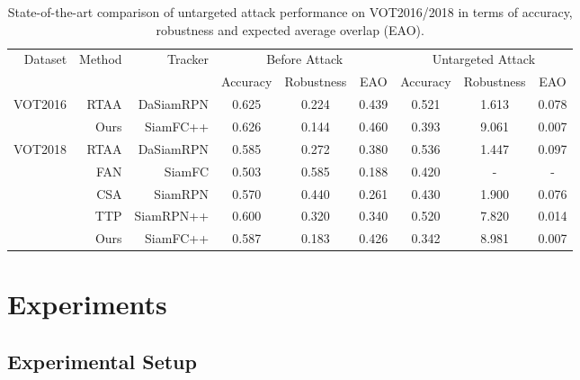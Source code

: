 \documentclass[journal]{IEEEtran}
\begin{document}
\begin{table}[t]
  \centering
  \caption{State-of-the-art comparison of untargeted attack performance on VOT2016/2018 in terms of accuracy, robustness and expected average overlap (EAO).}
  \begin{tabular}{rrrcccccc}
  \toprule
  \multirow{2}{*}[-2pt]{Dataset} & \multirow{2}{*}[-2pt]{Method} & \multirow{2}{*}[-2pt]{Tracker} & \multicolumn{3}{c}{Before Attack} & \multicolumn{3}{c}{Untargeted Attack} \\ \cmidrule{4-9}
                           &                         &                          & Accuracy   & Robustness  & EAO    & Accuracy    & Robustness    & EAO     \\ \midrule
  \multirow{2}{*}{VOT2016} & RTAA                    & DaSiamRPN                & 0.625      & 0.224       & 0.439  & 0.521       & 1.613         & 0.078   \\
                           & Ours                    & SiamFC++                 & 0.626      & 0.144       & 0.460  & 0.393       & 9.061         & 0.007   \\ \midrule
  \multirow{5}{*}{VOT2018} & RTAA                    & DaSiamRPN                & 0.585      & 0.272       & 0.380  & 0.536       & 1.447         & 0.097   \\
                           & FAN                     & SiamFC                   & 0.503      & 0.585       & 0.188  & 0.420       & -             & -       \\
                           & CSA                     & SiamRPN                  & 0.570      & 0.440       & 0.261  & 0.430       & 1.900         & 0.076   \\
                           & TTP                     & SiamRPN++                & 0.600      & 0.320       & 0.340  & 0.520       & 7.820         & 0.014   \\
                           & Ours                    & SiamFC++                 & 0.587      & 0.183       & 0.426  & 0.342       & 8.981         & 0.007   \\ \bottomrule
  \end{tabular}
  \label{tab:sota_vot}
\end{table}
\section{Experiments}

\subsection{Experimental Setup}\label{setup}
\end{document}
